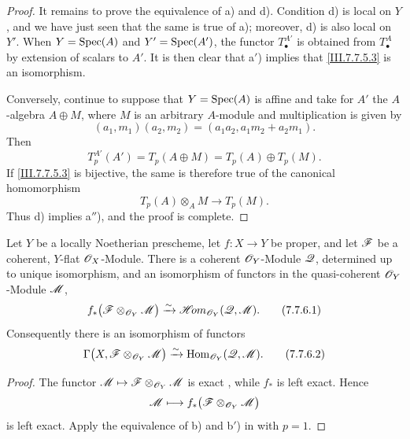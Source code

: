 {\begin{proof}
It remains to prove the equivalence of a) and d).  Condition
d) is local on $Y$, and we have just seen that the same is
true of a); moreover, d) is also local on $Y'$.  When
$Y=\operatorname{Spec}(A)$ and $Y'=\operatorname{Spec}(A')$, the functor
$T^{A'}_\bullet$ is obtained from $T^A_\bullet$ by extension
of scalars to $A'$.  It is then clear that a$'$) implies
that \eqref{III.7.7.5.3} is an isomorphism.

Conversely, continue to suppose that $Y=\operatorname{Spec}(A)$ is affine
and take for $A'$ the $A$-algebra $A\oplus M$, where $M$ is
an arbitrary $A$-module and multiplication is given by
\[
  (a_1,m_1)(a_2,m_2)
  =
  (a_1a_2,a_1m_2+a_2m_1).
\]
Then
\[
  T^{A'}_p(A')
  =
  T_p(A\oplus M)
  =
  T_p(A)\oplus T_p(M).
\]
If \eqref{III.7.7.5.3} is bijective, the same is therefore
true of the canonical homomorphism
\[
  T_p(A)\otimes_A M\longrightarrow T_p(M).
\]
Thus d) implies a$''$), and the proof is complete.
\end{proof}

\begin{theorem}[7.7.6]
\label{III.7.7.6}
Let $Y$ be a locally Noetherian prescheme, let
$f:X\to Y$ be proper, and let $\mathscr{F}$ be a coherent,
$Y$-flat $\mathscr{O}_X$-Module.  There is a coherent
$\mathscr{O}_Y$-Module $\mathscr{Q}$, determined up to unique
isomorphism, and an isomorphism of functors in the
quasi-coherent $\mathscr{O}_Y$-Module $\mathscr{M}$,
\[
  f_*
  \bigl(\sh{F}\otimes_{\sh{O}_Y}\sh{M}\bigr)
  \simto
  \shHom_{\sh{O}_Y}(\sh{Q},\sh{M}).
  \tag{7.7.6.1}\label{III.7.7.6.1}
\]
Consequently there is an isomorphism of functors
\[
  \Gamma
  \bigl(X,\sh{F}\otimes_{\sh{O}_Y}\sh{M}\bigr)
  \simto
  \Hom_{\sh{O}_Y}(\sh{Q},\sh{M}).
  \tag{7.7.6.2}\label{III.7.7.6.2}
\]
\end{theorem}

\begin{proof}
The functor
$\mathscr{M}\mapsto
 \mathscr{F}\otimes_{\mathscr{O}_Y}\mathscr{M}$
is exact , while $f_*$ is left exact.
Hence
\[
  \mathscr{M}\longmapsto
  f_*
  \bigl(\mathscr{F}\otimes_{\mathscr{O}_Y}\mathscr{M}\bigr)
\]
is left exact.  Apply the equivalence of b) and b$'$) in
 with $p=1$.
\end{proof}
}

